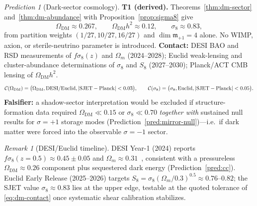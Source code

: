 \documentclass[11pt]{article}
\theoremstyle{plain}
\theoremstyle{definition}
\theoremstyle{remark}
\newtheorem{remark}[theorem]{Remark}
\newtheorem{prediction}[theorem]{Prediction}
\numberwithin{equation}{section}
\begin{document}
\begin{prediction}[Dark-sector cosmology]\label{pred:dm}
\textbf{T1 (derived).} Theorems~\ref{thm:dm-sector} and~\ref{thm:dm-abundance}
with Proposition~\ref{prop:sigma8} give
\begin{equation}\label{eq:pred-dm}
  \Omega_{\mathrm{DM}}\approx 0.267,
  \qquad
  \Omega_{\mathrm{DM}}h^2\approx 0.12,
  \qquad
  \sigma_8\approx 0.83,
\end{equation}
from partition weights $(1/27,10/27,16/27)$ and $\dim\mathfrak{m}_{+1}=4$ alone.
No WIMP, axion, or sterile-neutrino parameter is introduced.
\textbf{Contact:} DESI BAO and RSD measurements of
$f\sigma_8(z)$ and $\Omega_m$ (2024--2028); Euclid weak-lensing and
cluster-abundance determinations of $\sigma_8$ and $S_8$ (2027--2030);
Planck/ACT CMB lensing of $\Omega_{\mathrm{DM}}h^2$.
\begin{equation}\label{eq:dm-contact}
  \mathcal{C}(\Omega_{\mathrm{DM}})
  =\bigl(\Omega_{\mathrm{DM}},\mathrm{DESI/Euclid},|{\rm SJET}-{\rm Planck}|<0.03\bigr),
  \qquad
  \mathcal{C}(\sigma_8)
  =\bigl(\sigma_8,\mathrm{Euclid},|{\rm SJET}-{\rm Planck}|<0.05\bigr).
\end{equation}
\textbf{Falsifier:} a shadow-sector interpretation would be excluded if
structure-formation data required $\Omega_{\mathrm{DM}}\ll 0.15$ or
$\sigma_8\ll 0.70$ \emph{together with} sustained null results for
$\sigma=+1$ storage modes (Prediction~\ref{pred:mirror-null})---i.e.\ if dark
matter were forced into the observable $\sigma=-1$ sector.
\end{prediction}

\begin{remark}[DESI/Euclid timeline]
DESI Year-1 (2024) reports $f\sigma_8(z=0.5)\approx 0.45\pm0.05$ and
$\Omega_m\approx 0.31$~\cite{DESI2024}, consistent with a pressureless
$\Omega_{\mathrm{DM}}\approx 0.26$ component plus sequestered dark energy
(Prediction~\ref{pred:cc}). Euclid Early Release (2025--2026) targets
$S_8=\sigma_8(\Omega_m/0.3)^{0.5}\approx 0.76$--$0.82$; the SJET value
$\sigma_8\approx 0.83$ lies at the upper edge, testable at the quoted
tolerance of \eqref{eq:dm-contact} once systematic shear calibration
stabilizes.
\end{remark}
\end{document}
